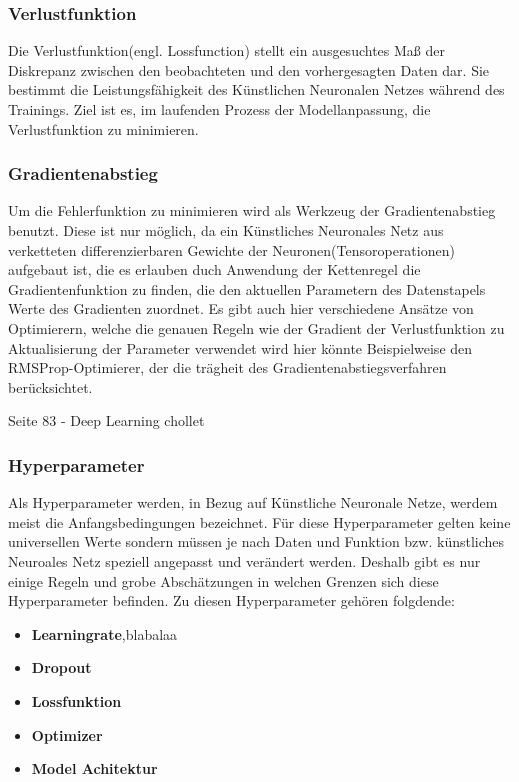 \subsubsection{Verlustfunktion}
Die Verlustfunktion(engl. Lossfunction) stellt ein ausgesuchtes Maß der Diskrepanz zwischen den beobachteten und den vorhergesagten Daten dar. Sie bestimmt die Leistungsfähigkeit des Künstlichen Neuronalen Netzes während des Trainings. Ziel ist es, im laufenden Prozess der Modellanpassung, die Verlustfunktion zu minimieren.

\subsubsection{Gradientenabstieg}
Um die Fehlerfunktion zu minimieren wird als Werkzeug der Gradientenabstieg benutzt. Diese ist nur möglich, da ein Künstliches Neuronales Netz aus verketteten differenzierbaren Gewichte der Neuronen(Tensoroperationen) aufgebaut ist, die es erlauben duch Anwendung der Kettenregel die Gradientenfunktion zu finden, die den aktuellen Parametern des Datenstapels Werte des Gradienten zuordnet. Es gibt auch hier verschiedene Ansätze von Optimierern, welche die genauen Regeln wie der Gradient der Verlustfunktion zu Aktualisierung der Parameter verwendet wird hier könnte Beispielweise den RMSProp-Optimierer, der die trägheit des Gradientenabstiegsverfahren berücksichtet.

Seite 83 - Deep Learning chollet


\subsubsection{Hyperparameter}
Als Hyperparameter werden, in Bezug auf Künstliche Neuronale Netze, werdem meist die Anfangsbedingungen bezeichnet. 
Für diese Hyperparameter gelten keine universellen Werte sondern müssen je nach Daten und Funktion bzw. künstliches Neuroales Netz speziell angepasst und verändert werden. Deshalb gibt es nur einige Regeln und grobe Abschätzungen in welchen Grenzen sich diese Hyperparameter befinden. Zu diesen Hyperparameter gehören folgdende:
\begin{itemize}
\item \textbf{Learningrate},blabalaa
\item \textbf{Dropout}
\item \textbf{Lossfunktion}
\item \textbf{Optimizer}
\item \textbf{Model Achitektur}
\end{itemize}

